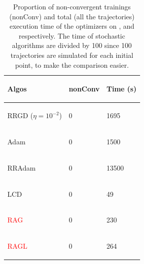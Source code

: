 \begin{table}[h!]
	\centering
	\caption{Proportion of non-convergent trainings (nonConv) and total (all the trajectories) execution time of the optimizers on \polyTwo, \polyThree and \polyFive respectively. The time of stochastic algorithms are divided by 100 since 100 trajectories are simulated for each initial point, to make the comparison easier.}
	\begin{tabular}{lll}
		\toprule
		\begin{bf} Algos \end{bf} & \begin{bf} nonConv \end{bf} & \begin{bf} Time (s) \end{bf} \\ \midrule
		\begin{bf}RRGD ($\eta=10^{-2}$) \end{bf} & 0 & 1695 \\ \midrule
		\begin{bf}Adam\end{bf} & 0 & 1500  \\ \midrule
		\begin{bf}RRAdam\end{bf} & 0 & 13500  \\ \midrule
		\begin{bf}LCD\end{bf} & 0 & 49  \\ \midrule
		\begin{bf}\textcolor{red}{RAG}\end{bf} & 0 & 230  \\ \midrule
		\begin{bf}\textcolor{red}{RAGL}\end{bf} & 0 & 264  \\ \bottomrule
	\end{tabular}
	
	\vspace{0.2cm}
	

\end{table}
